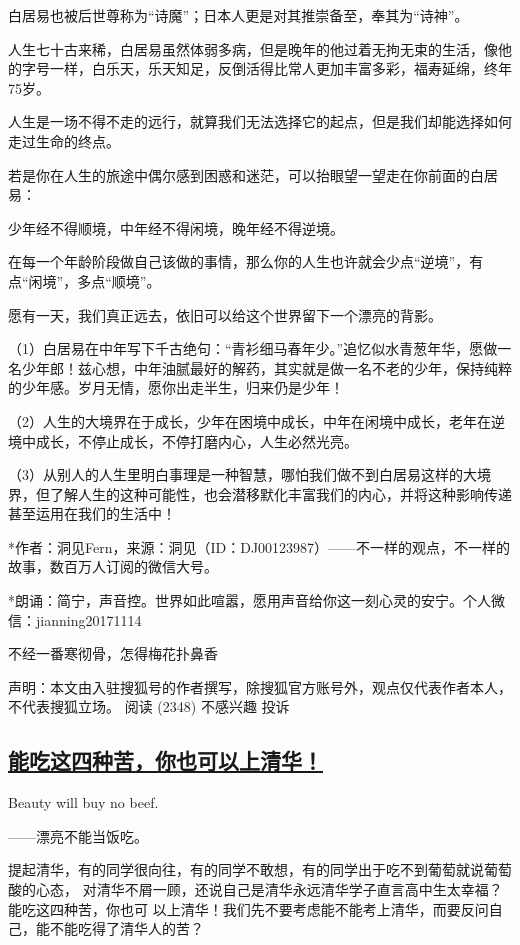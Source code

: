 \documentclass[11pt]{ctexart}
\begin{document}
{{{{白居易也被后世尊称为“诗魔”；日本人更是对其推崇备至，奉其为“诗神”。



人生七十古来稀，白居易虽然体弱多病，但是晚年的他过着无拘无束的生活，像他的字号一样，白乐天，乐天知足，反倒活得比常人更加丰富多彩，福寿延绵，终年75岁。

人生是一场不得不走的远行，就算我们无法选择它的起点，但是我们却能选择如何走过生命的终点。

若是你在人生的旅途中偶尔感到困惑和迷茫，可以抬眼望一望走在你前面的白居易：

少年经不得顺境，中年经不得闲境，晚年经不得逆境。

在每一个年龄阶段做自己该做的事情，那么你的人生也许就会少点“逆境”，有点“闲境”，多点“顺境”。

愿有一天，我们真正远去，依旧可以给这个世界留下一个漂亮的背影。

（1）白居易在中年写下千古绝句：“青衫细马春年少。”追忆似水青葱年华，愿做一名少年郎！兹心想，中年油腻最好的解药，其实就是做一名不老的少年，保持纯粹的少年感。岁月无情，愿你出走半生，归来仍是少年！

（2）人生的大境界在于成长，少年在困境中成长，中年在闲境中成长，老年在逆境中成长，不停止成长，不停打磨内心，人生必然光亮。

（3）从别人的人生里明白事理是一种智慧，哪怕我们做不到白居易这样的大境界，但了解人生的这种可能性，也会潜移默化丰富我们的内心，并将这种影响传递甚至运用在我们的生活中！

*作者：洞见Fern，来源：洞见（ID：DJ00123987）——不一样的观点，不一样的故事，数百万人订阅的微信大号。

*朗诵：简宁，声音控。世界如此喧嚣，愿用声音给你这一刻心灵的安宁。个人微信：jianning20171114

不经一番寒彻骨，怎得梅花扑鼻香


声明：本文由入驻搜狐号的作者撰写，除搜狐官方账号外，观点仅代表作者本人，不代表搜狐立场。
阅读 (2348) 不感兴趣  投诉

\subsection{\href{http://www.sohu.com/a/226720023\_112783?\_f=index\_chan25news\_40}{能吃这四种苦，你也可以上清华！ }}
\label{sec:org5cb2fd0}
Beauty will buy no beef.

——漂亮不能当饭吃。

提起清华，有的同学很向往，有的同学不敢想，有的同学出于吃不到葡萄就说葡萄酸的心态，
对清华不屑一顾，还说自己是清华永远清华学子直言高中生太幸福？能吃这四种苦，你也可
以上清华！我们先不要考虑能不能考上清华，而要反问自己，能不能吃得了清华人的苦？

}}}}
\end{document}
